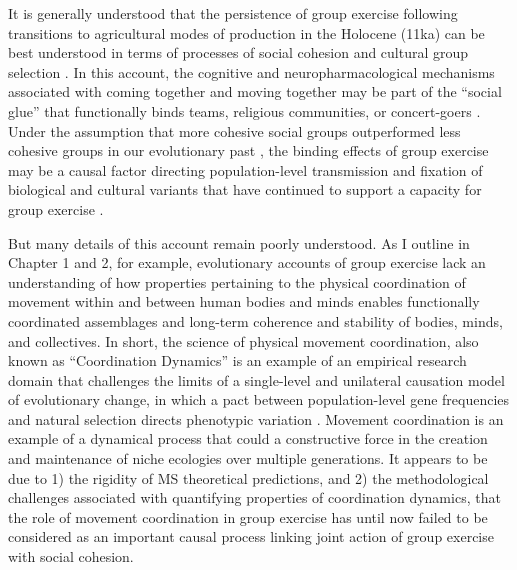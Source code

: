 It is generally understood that the persistence of group exercise following transitions to agricultural modes of production in the Holocene (11ka) can be best understood in terms of processes of social cohesion and cultural group selection \citep{Dunbar2010,Whitehouse2004,Cohen2017}.  In this account, the cognitive and neuropharmacological mechanisms associated with coming together and moving together may be part of the ``social glue'' that functionally binds teams, religious communities, or concert-goers \citep{Cohen2009,Fischer2014a}.  Under the assumption that more cohesive social groups outperformed less cohesive groups in our evolutionary past \citep{Turchin2013}, the binding effects of group exercise may be a causal factor directing population-level transmission and fixation of biological and cultural variants that have continued to support a capacity for group exercise \citep{Claidiere2014,Henrich2015}.

But many details of this account remain poorly understood.  As I outline in Chapter 1 and 2, for example, evolutionary accounts of group exercise lack an understanding of how properties pertaining to the physical coordination of movement within and between human bodies and minds enables functionally coordinated assemblages and long-term coherence and stability of bodies, minds, and collectives.  In short, the science of physical movement coordination, also known as ``Coordination Dynamics'' \citep{Kelso2009} is an example of an empirical research domain that challenges the limits of a single-level and unilateral causation model of evolutionary change, in which a pact between population-level gene frequencies and natural selection directs phenotypic variation \citep{Dawkins1976,Grafen1984}.  Movement coordination is an example of a dynamical process that could a constructive force in the creation and maintenance of niche ecologies over multiple generations.  It appears to be due to 1) the rigidity of MS theoretical predictions, and 2) the methodological challenges associated with quantifying properties of coordination dynamics, that the role of movement coordination in group exercise has until now failed to be considered as an important causal process linking joint action of group exercise with social cohesion.

